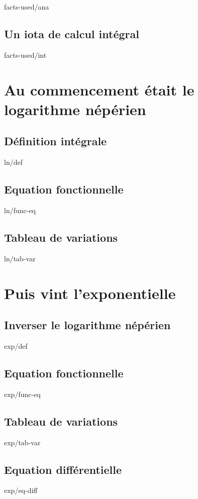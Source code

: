 \documentclass[12pt]{amsart}
\begin{document}
	{facts-used/ana}


	\subsection{Un iota de calcul intégral}

	{facts-used/int}




\section{Au commencement était le logarithme népérien}

	\subsection{Définition intégrale}

	{ln/def}


	\subsection{Equation fonctionnelle}

	{ln/func-eq}


	\subsection{Tableau de variations}

	{ln/tab-var}




\section{Puis vint l'exponentielle}

	\subsection{Inverser le logarithme népérien}

	{exp/def}


	\subsection{Equation fonctionnelle}

	{exp/func-eq}


	\subsection{Tableau de variations}

	{exp/tab-var}


	\subsection{Equation différentielle}

	{exp/eq-diff}
\end{document}
